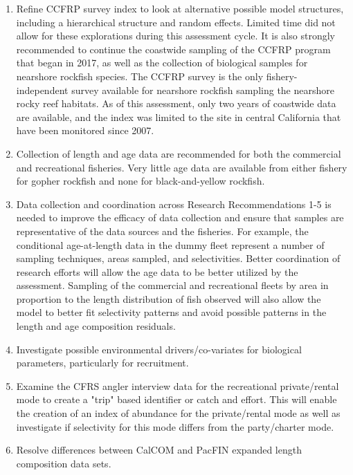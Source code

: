\documentclass[12pt,]{article}
\begin{document}
\begin{enumerate}
\item Refine CCFRP survey index to look at alternative possible model structures, including 
a hierarchical structure and random effects.  Limited time did not allow for these 
explorations during this assessment cycle.  It is also strongly recommended to continue 
the coastwide sampling of the CCFRP program that began in 2017, as well as the collection 
of biological samples for nearshore rockfish species.  The CCFRP survey is the only 
fishery-independent survey available for nearshore rockfish sampling the nearshore rocky 
reef habitats. As of this assessment, only two years of coastwide data are available, 
and the index was limited to the site in central California that have been monitored 
since 2007.

\item Collection of length and age data are recommended for both the commercial and 
recreational fisheries.  Very little age data are available from either fishery for 
gopher rockfish and none for black-and-yellow rockfish.

\item Data collection and coordination across Research Recommendations 1-5 is needed to improve 
the efficacy of data collection and ensure that samples are representative of the 
data sources and the fisheries.  For example, the conditional age-at-length data in 
the dummy fleet represent a number of sampling techniques, areas sampled, and 
selectivities.  Better coordination of research efforts will allow the age data 
to be better utilized by the assessment.  Sampling of the commercial and recreational 
fleets by area in proportion to the length distribution of fish observed will also 
allow the model to better fit selectivity patterns and avoid possible patterns in the 
length and age composition residuals.

\item Investigate possible environmental drivers/co-variates for biological parameters, 
particularly for recruitment.

\item Examine the CFRS angler interview data for the recreational private/rental mode 
to create a "trip" based identifier or catch and effort. This will enable the creation 
of an index of abundance for the private/rental mode as well as investigate if 
selectivity for this mode differs from the party/charter mode.

\item Resolve differences between CalCOM and PacFIN expanded length composition data sets. 


\end{enumerate}
\end{document}
